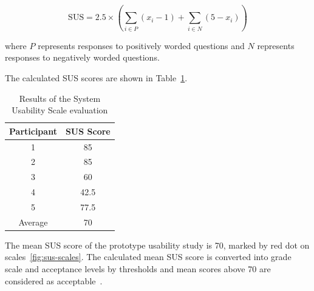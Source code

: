 \[
    \mathrm{SUS} =
        2.5 \times
        \left(
            \sum_{i \in P}(x_i - 1)
            +
            \sum_{i \in N}(5 - x_i)
        \right)
\]

where \(P\) represents responses to positively worded questions and \(N\) represents responses to negatively worded questions.

The calculated SUS scores are shown in Table~\ref{tab:susResults}.

\begin{table}[h]
    \centering
    \begin{tabular}{|c|c|}
        \hline
        Participant & SUS Score \\
        \hline
        1 & 85 \\
        2 & 85 \\
        3 & 60 \\
        4 & 42.5 \\
        5 & 77.5 \\
        \hline
        Average & 70 \\
        \hline
    \end{tabular}
    \caption{Results of the System Usability Scale evaluation}
    \label{tab:susResults}
\end{table}

The mean SUS score of the prototype usability study is 70, marked by red dot on scales~\ref{fig:sus-scales}.
The calculated mean SUS score is converted into grade scale and acceptance levels by thresholds
and mean scores above 70 are considered as acceptable~\parencite{setemen_sus}.

